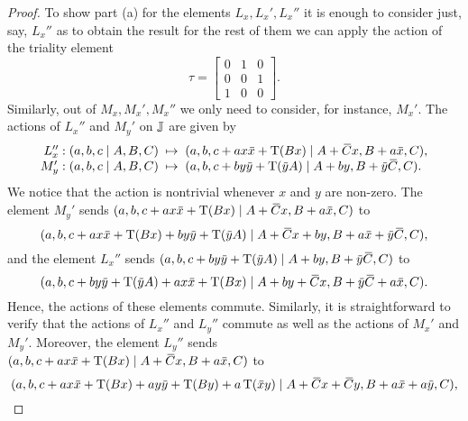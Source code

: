 \begin{proof}
	To show part (a) for the elements $L_x,L_x',L_x''$ it is enough to consider just, say, 
	$L_x''$ as to obtain the result for the rest of them we can apply the action of the 
	triality element
	\begin{equation*}
		\tau = \begin{bmatrix}
			0 & 1 & 0 \\
			0 & 0 & 1 \\
			1 & 0 & 0
		\end{bmatrix}.
	\end{equation*}
	Similarly, out of $M_x,M_x',M_x''$ we only need to consider, for instance, $M_x'$.
	The actions of $L_x''$ and $M_y'$ on $\mathbb{J}$ are given by
    \begin{equation}
    	\label{eq:1_q16_action}
        \begin{array}{r@{\;\;}c@{\;\;}l}
            L_x'': (a,b,c\mid A, B, C) & \mapsto &
            (a,b,c+a x \ovx  + \Tr(Bx) \mid A+\ovC x, B+a \ovx , C), \\
            M_y': (a,b,c\mid A,B,C) & \mapsto &
            (a,b,c+b y \ovy  + \Tr(\ovy A) \mid A + by, B+\ovy \ovC , C).
        \end{array}
    \end{equation}
    We notice that the action is nontrivial whenever $x$ and $y$ are non-zero. 
    The element $M_y'$ sends $(a,b,c+a x \ovx  + \Tr(Bx) \mid A+\ovC x, B+a
    \ovx , C)$ to
    \begin{equation*}
        (a,b,c+ax\ovx +\Tr(Bx)+by\ovy  + \Tr(\ovy A) \mid
            A+\ovC x + by, B+a\ovx  + \ovy \ovC , C ),
    \end{equation*}
    and the element $L_x''$ sends $(a,b,c+b y \ovy  + \Tr(\ovy A) \mid A + by, B+\ovy 
    \ovC , C)$ to
    \begin{equation*}
        (a,b,c+by\ovy  + \Tr(\ovy A) +ax\ovx  +\Tr(Bx) \mid A+by+\ovC x, B+\ovy \ovC 
        +a \ovx , C).
    \end{equation*}
    Hence, the actions of these elements commute. Similarly, it is straightforward to verify that
    the actions of $L_x''$ and $L_y''$ commute as well as the actions of $M_x'$ and $M_y'$.
    Moreover, the element $L_y''$ sends $(a,b,c+a x \ovx  + \Tr(Bx) \mid A+\ovC x, B+a
     \ovx , C)$ to
    \begin{equation*}
        (a,b,c+ax\ovx  + \Tr(Bx) + ay\ovy  + \Tr(By) + a\Tr(\ovx y) \mid
            A+\ovC x + \ovC y, B + a\ovx  + a\ovy , C),
    \end{equation*}

\end{proof}
